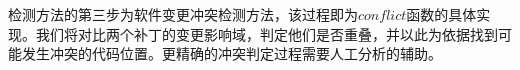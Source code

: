 %
%
%
%
%
%
%


检测方法的第三步为软件变更冲突检测方法，该过程即为$conflict$函数的具体实现。我们将对比两个补丁的变更影响域，判定他们是否重叠，并以此为依据找到可能发生冲突的代码位置。更精确的冲突判定过程需要人工分析的辅助。


